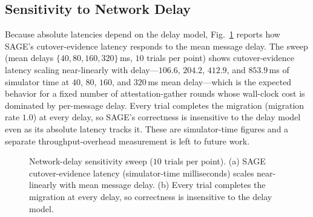 \documentclass[journal]{IEEEtran}
\begin{document}
\subsection{Sensitivity to Network Delay}
Because absolute latencies depend on the delay model, Fig.~\ref{fig:sens} reports how SAGE's
cutover-evidence latency responds to the mean message delay. The sweep
(mean delays $\{40,80,160,320\}\,$ms, $10$ trials per point)
shows cutover-evidence latency scaling near-linearly with delay---$106.6$, $204.2$, $412.9$, and
$853.9\,$ms of simulator time at $40$, $80$, $160$, and $320\,$ms mean delay---which is the
expected behavior for a fixed number of attestation-gather rounds whose wall-clock cost is
dominated by per-message delay. Every trial completes the migration (migration rate $1.0$) at
every delay, so SAGE's correctness is insensitive to the delay model even as its absolute latency
tracks it. These are simulator-time figures and a separate throughput-overhead measurement is
left to future work.

\begin{figure}[t]
\centering
{}
\caption{Network-delay sensitivity sweep ($10$ trials per point). (a) SAGE
cutover-evidence latency (simulator-time milliseconds) scales near-linearly with mean message
delay. (b) Every trial completes the migration at every delay, so correctness is insensitive to
the delay model.}
\label{fig:sens}
\end{figure}
\end{document}
